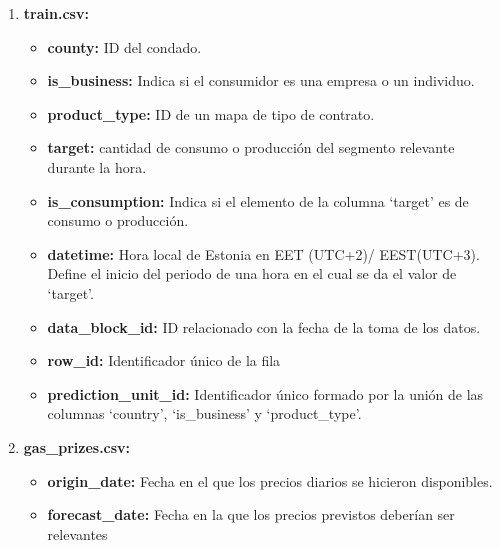 \documentclass[a4paper,12pt]{article}
\begin{document}
\begin{enumerate}
    \item \textbf{train.csv:}
    \begin{itemize}
        \item \textbf{county:} 
        ID del condado.

        \item \textbf{is\_business:}
        Indica si el consumidor es una empresa o
        un individuo.

        \item \textbf{product\_type:}
        ID de un mapa de tipo de contrato.

        \item \textbf{target:} 
        cantidad de consumo o producción del 
        segmento relevante durante la hora. 

        \item \textbf{is\_consumption:}
        Indica si el elemento de la columna 
        `target' es de consumo o producción.

        \item \textbf{datetime:}
        Hora local de Estonia en EET (UTC+2)/
        EEST(UTC+3). Define el inicio del periodo
        de una hora en el cual se da el valor de 
        `target'.

        \item \textbf{data\_block\_id:}
        ID relacionado con la fecha de la toma de los datos.
        
        \item \textbf{row\_id:}
        Identificador único de la fila

        \item \textbf{prediction\_unit\_id:}
        Identificador único formado por la unión de
        las columnas `country', `is\_business' y 
        `product\_type'.

    \end{itemize}
    
    \item \textbf{gas\_prizes.csv:}
    \begin{itemize}

        \item \textbf{origin\_date:}
        Fecha en el que los precios diarios
        se hicieron disponibles.

        \item \textbf{forecast\_date:}
        Fecha en la que los precios previstos
        deberían ser relevantes


\end{itemize}
\end{enumerate}
\end{document}
